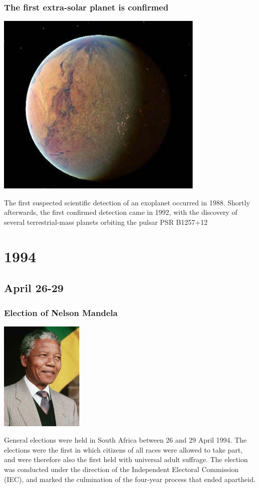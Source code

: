 \documentclass[11pt]{report}
\begin{document}
\subsection{The first extra-solar planet is confirmed}
\vspace{2mm}\begin{center}\includegraphics[width=10cm]{./img/PSR_B1257_12_C.jpg}\end{center}
The first suspected scientific detection of an exoplanet occurred in 1988. Shortly afterwards, the first confirmed detection came in 1992, with the discovery of several terrestrial-mass planets orbiting the pulsar PSR B1257+12

\chapter{1994}
\section{April 26-29}
\subsection{Election of Nelson Mandela}
\vspace{2mm}\begin{center}\includegraphics[width=4cm]{./img/mandela.jpg}\end{center}
General elections were held in South Africa between 26 and 29 April 1994. The elections were the first in which citizens of all races were allowed to take part, and were therefore also the first held with universal adult suffrage. The election was conducted under the direction of the Independent Electoral Commission (IEC), and marked the culmination of the four-year process that ended apartheid.
\end{document}
